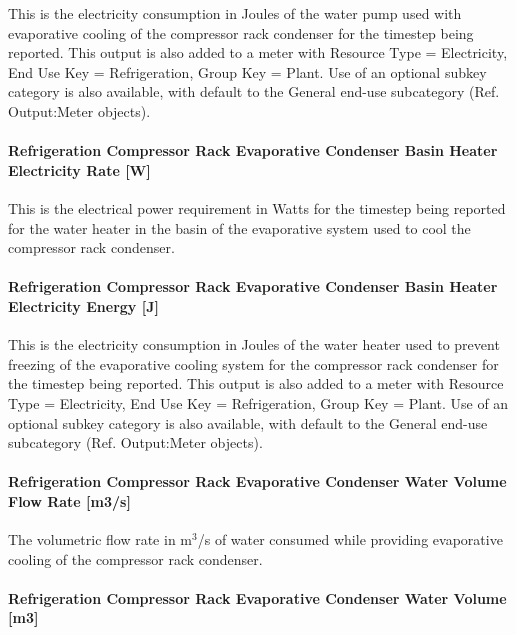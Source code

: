 This is the electricity consumption in Joules of the water pump used with evaporative cooling of the compressor rack condenser for the timestep being reported. This output is also added to a meter with Resource Type = Electricity, End Use Key = Refrigeration, Group Key = Plant. Use of an optional subkey category is also available, with default to the General end-use subcategory (Ref. Output:Meter objects).

\paragraph{Refrigeration Compressor Rack Evaporative Condenser Basin Heater Electricity Rate {[}W{]}}\label{refrigeration-compressor-rack-evaporative-condenser-basin-heater-electric-power-w}

This is the electrical power requirement in Watts for the timestep being reported for the water heater in the basin of the evaporative system used to cool the compressor rack condenser.

\paragraph{Refrigeration Compressor Rack Evaporative Condenser Basin Heater Electricity Energy {[}J{]}}\label{refrigeration-compressor-rack-evaporative-condenser-basin-heater-electric-energy-j}

This is the electricity consumption in Joules of the water heater used to prevent freezing of the evaporative cooling system for the compressor rack condenser for the timestep being reported. This output is also added to a meter with Resource Type = Electricity, End Use Key = Refrigeration, Group Key = Plant. Use of an optional subkey category is also available, with default to the General end-use subcategory (Ref. Output:Meter objects).

\paragraph{Refrigeration Compressor Rack Evaporative Condenser Water Volume Flow Rate {[}m3/s{]}}\label{refrigeration-compressor-rack-evaporative-condenser-water-volume-flow-rate-m3s}

The volumetric flow rate in m\(^{3}\)/s of water consumed while providing evaporative cooling of the compressor rack condenser.

\paragraph{Refrigeration Compressor Rack Evaporative Condenser Water Volume {[}m3{]}}\label{refrigeration-compressor-rack-evaporative-condenser-water-volume-m3}


